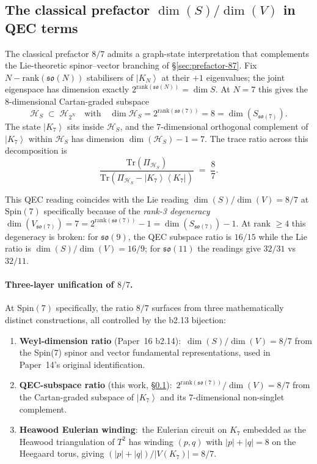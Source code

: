 \documentclass[11pt]{article}
\newcommand{\so}{\mathfrak{so}}
\newcommand{\Spin}{\mathrm{Spin}}
\newcommand{\ket}[1]{\left|#1\right\rangle}
\newcommand{\bra}[1]{\left\langle#1\right|}
\newcommand{\rank}{\mathrm{rank}}
\newcommand{\Tr}{\mathrm{Tr}}
\begin{document}
\subsection{The classical prefactor $\dim(S)/\dim(V)$ in QEC terms}
\label{sec:qec-prefactor}

The classical prefactor $8/7$ admits a graph-state interpretation
that complements the Lie-theoretic spinor--vector branching of
\S\ref{sec:prefactor-87}.  Fix $N - \rank(\so(N))$ stabilisers of
$\ket{K_N}$ at their $+1$ eigenvalues; the joint eigenspace has
dimension exactly $2^{\rank(\so(N))} = \dim S$.  At $N = 7$ this
gives the 8-dimensional Cartan-graded subspace
\begin{equation}
  \mathcal{H}_S \;\subset\; \mathcal{H}_{2^N}
  \quad\text{with}\quad
  \dim \mathcal{H}_S = 2^{\rank(\so(7))} = 8 = \dim(S_{\so(7)}).
\end{equation}
The state $\ket{K_7}$ sits inside $\mathcal{H}_S$, and the
$7$-dimensional orthogonal complement of $\ket{K_7}$ within
$\mathcal{H}_S$ has dimension $\dim(\mathcal{H}_S) - 1 = 7$.  The trace
ratio across this decomposition is
\begin{equation}
  \frac{\Tr(\Pi_{\mathcal{H}_S})}{\Tr(\Pi_{\mathcal{H}_S} - \ket{K_7}\!\bra{K_7})}
  \;=\; \frac{8}{7}.
\end{equation}

This QEC reading coincides with the Lie reading
$\dim(S)/\dim(V) = 8/7$ at $\Spin(7)$ specifically because of the
\emph{rank-3 degeneracy} $\dim(V_{\so(7)}) = 7 = 2^{\rank(\so(7))} - 1
= \dim(S_{\so(7)}) - 1$.  At rank $\geq 4$ this degeneracy is broken:
for $\so(9)$, the QEC subspace ratio is $16/15$ while the Lie ratio
is $\dim(S)/\dim(V) = 16/9$; for $\so(11)$ the readings give
$32/31$ vs $32/11$.

\paragraph{Three-layer unification of $8/7$.}
At $\Spin(7)$ specifically, the ratio $8/7$ surfaces from three
mathematically distinct constructions, all controlled by the
b2.13 bijection:

\begin{enumerate}
\item \textbf{Weyl-dimension ratio} (Paper~16 b2.14):\
  $\dim(S)/\dim(V) = 8/7$ from the Spin(7) spinor and vector
  fundamental representations, used in Paper~14's original
  identification.
\item \textbf{QEC-subspace ratio} (this work, \S\ref{sec:qec-prefactor}):\
  $2^{\rank(\so(7))}/\dim(V) = 8/7$ from the Cartan-graded subspace
  of $\ket{K_7}$ and its $7$-dimensional non-singlet complement.
\item \textbf{Heawood Eulerian winding}:\
  the Eulerian circuit on $K_7$ embedded as the Heawood
  triangulation of $T^2$ has winding $(p, q)$ with
  $|p| + |q| = 8$ on the Heegaard torus, giving
  $(|p|+|q|)/|V(K_7)| = 8/7$.
\end{enumerate}
\end{document}

